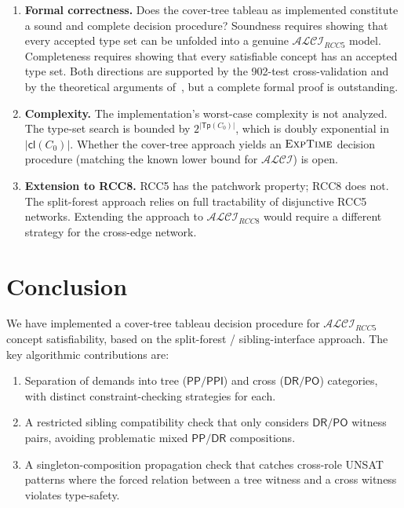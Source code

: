 \documentclass[a4paper,11pt]{article}
\theoremstyle{definition}
\newcommand{\ALCI}{\ensuremath{\mathcal{ALCI}}}
\newcommand{\ALCIRCC}[1]{\ensuremath{\mathcal{ALCI}_{\mathit{RCC#1}}}}
\newcommand{\DR}{\ensuremath{\mathsf{DR}}}
\newcommand{\PO}{\ensuremath{\mathsf{PO}}}
\newcommand{\PP}{\ensuremath{\mathsf{PP}}}
\newcommand{\PPI}{\ensuremath{\mathsf{PPI}}}
\newcommand{\cl}{\ensuremath{\mathsf{cl}}}
\newcommand{\Tp}{\ensuremath{\mathsf{Tp}}}
\newcommand{\EXPTIME}{\textsc{ExpTime}}
\begin{document}
\begin{enumerate}[label=(\arabic*)]
  \item \textbf{Formal correctness.}
    Does the cover-tree tableau as implemented constitute a sound
    and complete decision procedure?  Soundness requires showing
    that every accepted type set can be unfolded into a genuine
    $\ALCIRCC{5}$ model.  Completeness requires showing that every
    satisfiable concept has an accepted type set.  Both directions
    are supported by the 902-test cross-validation and by the
    theoretical arguments of~\cite{SiblingCompleted}, but a
    complete formal proof is outstanding.

  \item \textbf{Complexity.}
    The implementation's worst-case complexity is not analyzed.
    The type-set search is bounded by $2^{|\Tp(C_0)|}$, which
    is doubly exponential in $|\cl(C_0)|$.  Whether the
    cover-tree approach yields an $\EXPTIME$ decision procedure
    (matching the known lower bound for $\ALCI$) is open.

  \item \textbf{Extension to RCC8.}
    RCC5 has the patchwork property; RCC8 does not.  The
    split-forest approach relies on full tractability of
    disjunctive RCC5 networks.  Extending the approach to
    $\ALCIRCC{8}$ would require a different strategy for the
    cross-edge network.
\end{enumerate}


\section{Conclusion}
\label{sec:conclusion}

We have implemented a cover-tree tableau decision procedure for
$\ALCIRCC{5}$ concept satisfiability, based on the split-forest /
sibling-interface approach.  The key algorithmic contributions are:
\begin{enumerate}[nosep]
  \item Separation of demands into tree ($\PP/\PPI$) and cross
    ($\DR/\PO$) categories, with distinct constraint-checking
    strategies for each.
  \item A restricted sibling compatibility check that only
    considers $\DR/\PO$ witness pairs, avoiding problematic
    mixed $\PP/\DR$ compositions.
  \item A singleton-composition propagation check that catches
    cross-role UNSAT patterns where the forced relation between
    a tree witness and a cross witness violates type-safety.
\end{enumerate}
\end{document}
